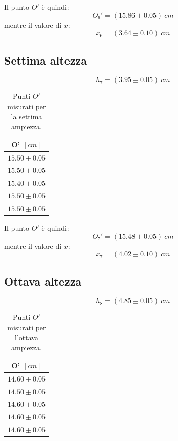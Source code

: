 Il punto $O'$ è quindi:
\begin{equation}
	O_6'=(15.86\pm0.05)\ cm
\end{equation}
mentre il valore di $x$:
\begin{equation}
	x_6=(3.64\pm 0.10)\ cm
\end{equation}

\subsection{Settima altezza}
\begin{equation}
	h_7=(3.95\pm0.05)\ cm
\end{equation}

\begin{table}[H]
	\centering
	\begin{tabular}{|c|}
		\hline
		\textbf{O' $[cm]$} \\
		\hline
		$15.50\pm 0.05$ \\
		$15.50\pm 0.05$ \\
		$15.40\pm 0.05$ \\
		$15.50\pm 0.05$ \\
		$15.50\pm 0.05$ \\
		\hline
	\end{tabular}
	\caption{Punti $O'$ misurati per la settima ampiezza.}
	\label{tab:}
\end{table}

Il punto $O'$ è quindi:
\begin{equation}
	O_7'=(15.48\pm0.05)\ cm
\end{equation}
mentre il valore di $x$:
\begin{equation}
	x_7=(4.02\pm 0.10)\ cm
\end{equation}

\subsection{Ottava altezza}
\begin{equation}
	h_8=(4.85\pm0.05)\ cm
\end{equation}

\begin{table}[H]
	\centering
	\begin{tabular}{|c|}
		\hline
		\textbf{O' $[cm]$} \\
		\hline
		$14.60\pm 0.05$ \\
		$14.50\pm 0.05$ \\
		$14.60\pm 0.05$ \\
		$14.60\pm 0.05$ \\
		$14.60\pm 0.05$ \\
		\hline
	\end{tabular}
	\caption{Punti $O'$ misurati per l'ottava ampiezza.}
	\label{tab:}
\end{table}

